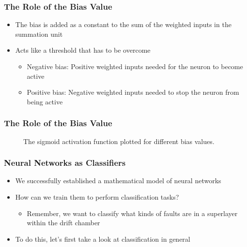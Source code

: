 \begin{frame}
  \frametitle{The Role of the Bias Value}
  \begin{itemize}
    \item The bias is added as a constant to the sum of the weighted
      inputs in the summation unit
    \item Acts like a threshold that has to be overcome
      \begin{itemize}
        \item Negative bias: Positive weighted inputs needed for the
          neuron to become active
        \item Positive bias: Negative weighted inputs needed to stop
          the neuron from being active
      \end{itemize}
  \end{itemize}
\end{frame}

\begin{frame}
  \frametitle{The Role of the Bias Value}
  \begin{figure}
    \resizebox{.6\textwidth}{!}{}
    \caption{The sigmoid activation function plotted for different bias values.}
  \end{figure}
\end{frame}

\begin{frame}
  \frametitle{Neural Networks as Classifiers}
  \begin{itemize}
    \item We successfully established a mathematical model of neural
      networks
    \item How can we train them to perform classification tasks?
      \begin{itemize}
        \item Remember, we want to classify what kinds of faults are
          in a superlayer within the drift chamber
      \end{itemize}
    \item To do this, let's first take a look at classification in general
  \end{itemize}
\end{frame}

